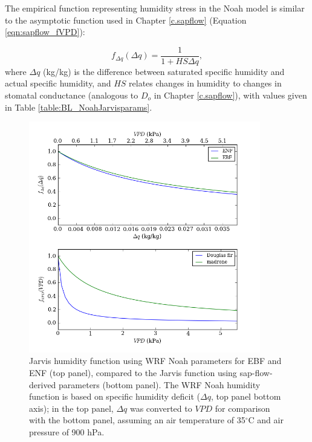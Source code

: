 The empirical function representing humidity stress in the Noah model is similar to the asymptotic function used in Chapter \ref{c.sapflow} (Equation \ref{eqn:sapflow_fVPD}):

\begin{equation}
f_{\Delta q}(\Delta q) = \frac{1}{1+HS \Delta q},
\label{eqn:BL_WRFq}
\end{equation}
where $\Delta q$ (kg/kg) is the difference between saturated specific humidity and actual specific humidity, and $HS$ relates changes in humidity to changes in stomatal conductance (analogous to $D_o$ in Chapter \ref{c.sapflow}), with values given in Table \ref{table:BL_NoahJarvisparams}.

\begin{figure}[here]
\includegraphics[width=0.9\textwidth]{ch2-BL/figures/humidity_functions.png}
\caption{Jarvis humidity function using WRF Noah parameters for EBF and ENF (top panel), compared to the Jarvis function using sap-flow-derived parameters (bottom panel).  The WRF Noah humidity function is based on specific humidity deficit ($\Delta q$, top panel bottom axis); in the top panel, $\Delta q$ was converted to $VPD$ for comparison with the bottom panel, assuming an air temperature of 35$^\circ$C and air pressure of 900 hPa.}
\label{fig:BL_humidity}
\end{figure}

